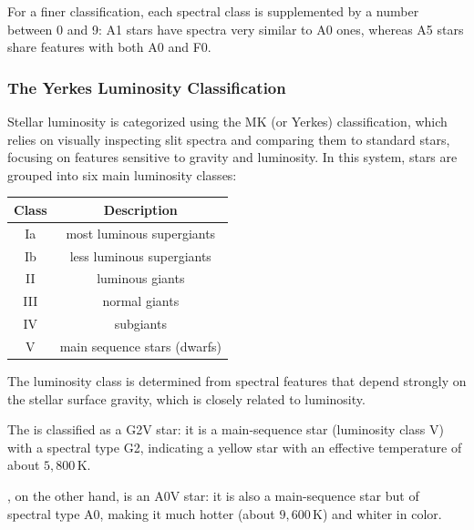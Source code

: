 \vspace{-0.7em}

For a finer classification, each spectral class is supplemented by a number between 0 and 9: A1 stars have spectra very similar to A0 ones, whereas A5 stars share features with both A0 and F0.

\subsubsection{The Yerkes Luminosity Classification}

Stellar luminosity is categorized using the MK (or Yerkes) classification, which relies on visually inspecting slit spectra and comparing them to standard stars, focusing on features sensitive to gravity and luminosity. In this system, stars are grouped into six main luminosity classes:

\vspace{-0.4em}

\begin{table}[H]
    \centering
    \begin{tabular}{cc}
        \toprule
        \textbf{Class} & \textbf{Description} \\
        \midrule
        Ia  & most luminous supergiants \\
        Ib  & less luminous supergiants \\
        II  & luminous giants \\
        III & normal giants \\
        IV  & subgiants \\
        V   & main sequence stars (dwarfs) \\
        \bottomrule
    \end{tabular}
\end{table}

\vspace{-0.7em}

The luminosity class is determined from spectral features that depend strongly on the stellar surface gravity, which is closely related to luminosity.

\begin{tipsblock}
    The  is classified as a G2V star: it is a main-sequence star (luminosity class V) with a spectral type G2, indicating a yellow star with an effective temperature of about $5{,}800\,\mathrm{K}$. 

    \medskip

    , on the other hand, is an A0V star: it is also a main-sequence star but of spectral type A0, making it much hotter (about $9{,}600\,\mathrm{K}$) and whiter in color. 
\end{tipsblock}

